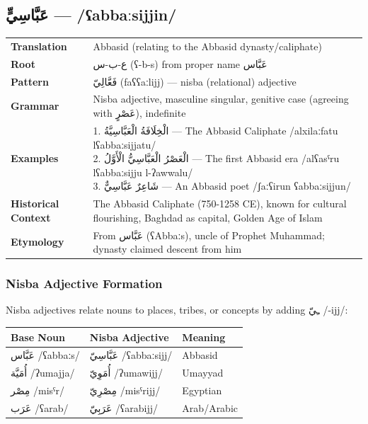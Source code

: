 \documentclass[letterpaper,12pt]{article}
\begin{document}
\subsection{\textarabic{عَبَّاسِيٍّ} — /ʕabbaːsijjin/}
\begin{tabular}{p{3cm}p{10cm}}
\toprule
\textbf{Translation} & Abbasid (relating to the Abbasid dynasty/caliphate) \\
\textbf{Root} & \textarabic{ع-ب-س} (ʕ-b-s) from proper name \textarabic{عَبَّاس} \\
\textbf{Pattern} & \textarabic{فَعَّالِيّ} (faʕʕaːlijj) — nisba (relational) adjective \\
\textbf{Grammar} & Nisba adjective, masculine singular, genitive case (agreeing with \textarabic{عَصْرٍ}), indefinite \\
\midrule
\textbf{Examples} & \makecell[l]{\parbox{9.5cm}{
1. \textarabic{الْخِلَافَةُ الْعَبَّاسِيَّةُ} — The Abbasid Caliphate /alxilaːfatu lʕabbaːsijjatu/\\
2. \textarabic{الْعَصْرُ الْعَبَّاسِيُّ الْأَوَّلُ} — The first Abbasid era /alʕasˤru lʕabbaːsijju l-ʔawwalu/\\
3. \textarabic{شَاعِرٌ عَبَّاسِيٌّ} — An Abbasid poet /ʃaːʕirun ʕabbaːsijjun/
}} \\
\midrule
\textbf{Historical Context} & The Abbasid Caliphate (750-1258 CE), known for cultural flourishing, Baghdad as capital, Golden Age of Islam \\
\textbf{Etymology} & From \textarabic{عَبَّاس} (ʕAbbaːs), uncle of Prophet Muhammad; dynasty claimed descent from him \\
\bottomrule
\end{tabular}

\subsubsection*{Nisba Adjective Formation}
Nisba adjectives relate nouns to places, tribes, or concepts by adding \textarabic{ـِيّ} /-ijj/:

\begin{tabular}{|l|l|l|}
\hline
\textbf{Base Noun} & \textbf{Nisba Adjective} & \textbf{Meaning} \\
\hline
\textarabic{عَبَّاس} /ʕabbaːs/ & \textarabic{عَبَّاسِيّ} /ʕabbaːsijj/ & Abbasid \\
\hline
\textarabic{أُمَيَّة} /ʔumajja/ & \textarabic{أُمَوِيّ} /ʔumawijj/ & Umayyad \\
\hline
\textarabic{مِصْر} /misˤr/ & \textarabic{مِصْرِيّ} /misˤrijj/ & Egyptian \\
\hline
\textarabic{عَرَب} /ʕarab/ & \textarabic{عَرَبِيّ} /ʕarabijj/ & Arab/Arabic \\
\hline
\end{tabular}
\end{document}
